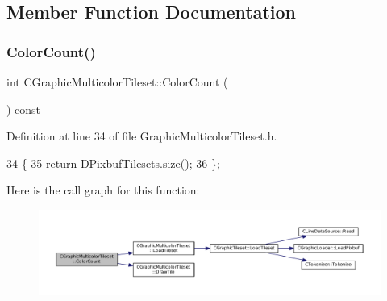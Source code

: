 \subsection{Member Function Documentation}
\hypertarget{classCGraphicMulticolorTileset_abde63a1cef8d3eaeafe5c86f31ab9cae}{}\label{classCGraphicMulticolorTileset_abde63a1cef8d3eaeafe5c86f31ab9cae} 
\subsubsection{\texorpdfstring{Color\+Count()}{ColorCount()}}
{\footnotesize\ttfamily int C\+Graphic\+Multicolor\+Tileset\+::\+Color\+Count (\begin{DoxyParamCaption}{ }\end{DoxyParamCaption}) const\hspace{0.3cm}{\ttfamily [inline]}}



Definition at line 34 of file Graphic\+Multicolor\+Tileset.\+h.


\begin{DoxyCode}
34                               \{
35             \textcolor{keywordflow}{return} \hyperlink{classCGraphicMulticolorTileset_a30809d113b0f314944425a3c8f21408c}{DPixbufTilesets}.size();  
36         \};
\end{DoxyCode}
Here is the call graph for this function\+:
\nopagebreak
\begin{figure}[H]
\begin{center}
\leavevmode
\includegraphics[width=350pt]{classCGraphicMulticolorTileset_abde63a1cef8d3eaeafe5c86f31ab9cae_cgraph}
\end{center}
\end{figure}
\hypertarget{classCGraphicMulticolorTileset_a17ee648ac82c48079a1853dc8a10365a}{}\label{classCGraphicMulticolorTileset_a17ee648ac82c48079a1853dc8a10365a} 
